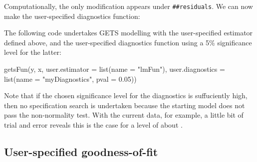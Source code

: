 %
Computationally, the only modification appears under \verb|##residuals|. We can now make the user-specified diagnostics function:
%
%
The following code undertakes GETS modelling with the user-specified estimator defined above, and the user-specified diagnostics function using a 5\% significance level for the latter:
%
\begin{example}
  getsFun(y, x, user.estimator = list(name = "lmFun"),
    user.diagnostics = list(name = "myDiagnostics", pval = 0.05))
\end{example}
%
Note that if the chosen significance level for the diagnostics is suffuciently high, then no specification search is undertaken because the starting model does not pass the non-normality test. With the current data, for example, a little bit of trial and error reveals this is the case for a level of about .

\subsection{User-specified goodness-of-fit}

